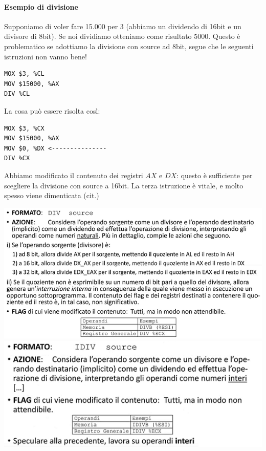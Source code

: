\documentclass[11pt]{report}
\begin{document}
\paragraph{Esempio di divisione} Supponiamo di voler fare 15.000 per 3 (abbiamo un dividendo di 16bit e un divisore di 8bit). Se noi dividiamo otteniamo come risultato 5000. Questo è problematico se adottiamo la divisione con source ad 8bit, segue che le seguenti istruzioni non vanno bene!
\begin{verbatim}
MOX $3, %CL
MOV $15000, %AX
DIV %CL
\end{verbatim}
La cosa può essere risolta così:
\begin{verbatim}
MOX $3, %CX
MOV $15000, %AX
MOV $0, %DX <---------------
DIV %CX
\end{verbatim}
Abbiamo modificato il contenuto dei registri $AX$ e $DX$: questo è sufficiente per scegliere la divisione con source a 16bit. La terza istruzione è vitale, e molto spesso viene dimenticata (cit.)
\begin{center}
\includegraphics{img/21.PNG}
\includegraphics{img/22.PNG}
\end{center}
\end{document}
